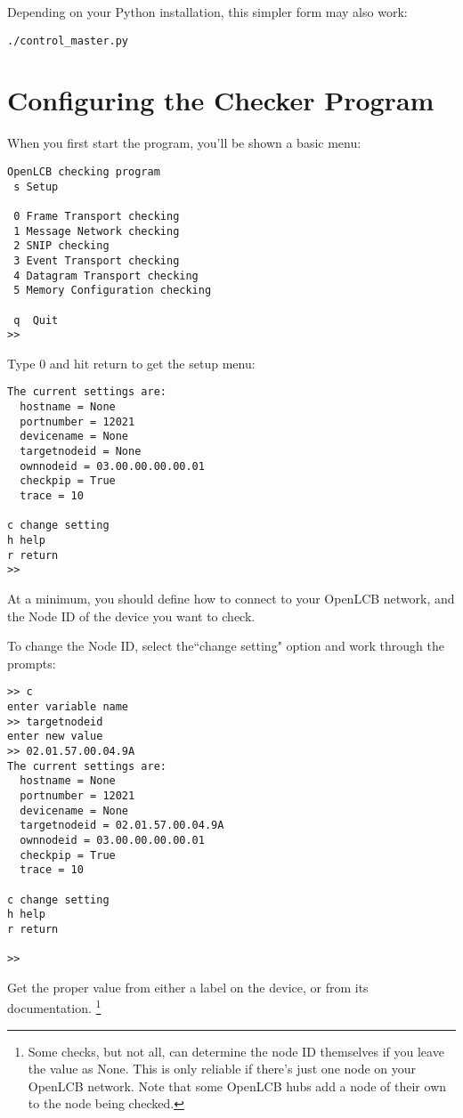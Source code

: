 \documentclass[11pt]{article}
\begin{document}
Depending on your Python installation, this simpler form may also work:
\begin{verbatim}
./control_master.py
\end{verbatim}


\section{Configuring the Checker Program}

When you first start the program, you'll be shown a basic menu:

\begin{verbatim}
OpenLCB checking program
 s Setup

 0 Frame Transport checking
 1 Message Network checking
 2 SNIP checking
 3 Event Transport checking
 4 Datagram Transport checking
 5 Memory Configuration checking
  
 q  Quit
>> 
\end{verbatim}

Type 0 and hit return to get the setup menu:

\begin{verbatim}
The current settings are:
  hostname = None
  portnumber = 12021
  devicename = None
  targetnodeid = None
  ownnodeid = 03.00.00.00.00.01
  checkpip = True
  trace = 10

c change setting
h help
r return
>> 
\end{verbatim}

At a minimum, you should define how to connect to your OpenLCB network,
and the Node ID of the device you want to check.  

To change the Node ID, select the``change setting" option and work through the prompts:

\begin{verbatim}
>> c
enter variable name
>> targetnodeid
enter new value
>> 02.01.57.00.04.9A
The current settings are:
  hostname = None
  portnumber = 12021
  devicename = None
  targetnodeid = 02.01.57.00.04.9A
  ownnodeid = 03.00.00.00.00.01
  checkpip = True
  trace = 10

c change setting
h help
r return

>> 
\end{verbatim}

Get the proper value from either a label on the device, or from its documentation.
\footnote{Some checks, but not all, can determine the node ID themselves if you leave
    the value as None. This is only reliable if there's just one node on your OpenLCB
    network.  Note that some OpenLCB hubs add a node of their own to the node
    being checked.}
    
\end{document}
